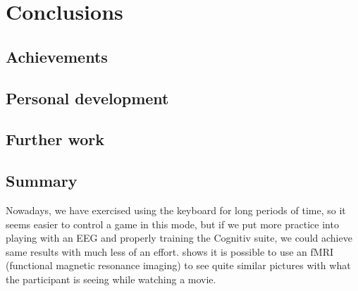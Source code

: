\chapter{Conclusions}
\label{cha:conclusions}

\section{Achievements}

\section{Personal development}

\section{Further work}

\section{Summary}

Nowadays, we have exercised using the keyboard for long periods of time, so it seems easier to control a game in this mode, but if we put more practice into playing with an EEG and properly training the Cognitiv suite, we could achieve same results with much less of an effort. \cite{moviebrain} shows it is possible to use an fMRI (functional magnetic resonance imaging) to see quite similar pictures with what the participant is seeing while watching a movie.